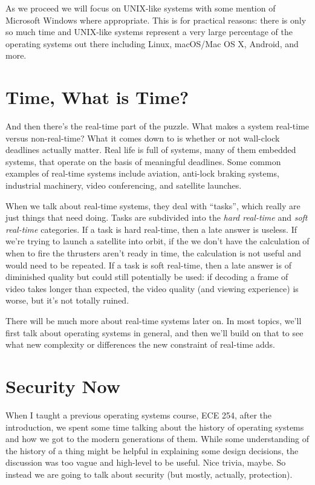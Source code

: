 As we proceed we will focus on UNIX-like systems with some mention of Microsoft Windows where appropriate. This is for practical reasons: there is only so much time and UNIX-like systems represent a very large percentage of the operating systems out there including Linux, macOS/Mac OS X, Android, and more.

\section*{Time, What is Time?}
And then there's the real-time part of the puzzle. What makes a system real-time versus non-real-time? What it comes down to is whether or not wall-clock deadlines actually matter. Real life is full of systems, many of them embedded systems, that operate on the basis of meaningful deadlines. Some common examples of real-time systems include aviation, anti-lock braking systems, industrial machinery, video conferencing, and satellite launches.

When we talk about real-time systems, they deal with ``tasks'', which really are just things that need doing. Tasks are subdivided into the \textit{hard real-time} and \textit{soft real-time} categories. If a task is hard real-time, then a late answer is useless. If we're trying to launch a satellite into orbit, if the we don't have the calculation of when to fire the thrusters aren't ready in time, the calculation is not useful and would need to be repeated. If a task is soft real-time, then a late answer is of diminished quality but could still potentially be used: if decoding a frame of video takes longer than expected, the video quality (and viewing experience) is worse, but it's not totally ruined.

There will be much more about real-time systems later on. In most topics, we'll first talk about operating systems in general, and then we'll build on that to see what new complexity or differences the new constraint of real-time adds. 

\section*{Security Now}
When I taught a previous operating systems course, ECE 254, after the introduction, we spent some time talking about the history of operating systems and how we got to the modern generations of them. While some understanding of the history of a thing might be helpful in explaining some design decisions, the discussion was too vague and high-level to be useful. Nice trivia, maybe. So instead we are going to talk about security (but mostly, actually, protection).

